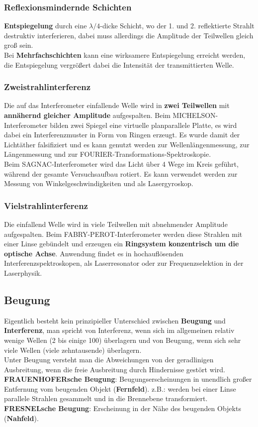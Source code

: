 \documentclass[12pt,a4paper,ngerman]{article}
\begin{document}
\subsubsection*{Reflexionsmindernde Schichten}
\textbf{Entspiegelung} durch eine $\lambda/4$-dicke Schicht, wo der 1. und 2. reflektierte Strahlt destruktiv interferieren, dabei muss allerdings die Amplitude der Teilwellen gleich groß sein. \\
Bei \textbf{Mehrfachschichten} kann eine wirksamere Entspiegelung erreicht werden, die Entspiegelung vergrößert dabei die Intensität der transmittierten Welle.

\subsubsection*{Zweistrahlinterferenz}
Die auf das Interferometer einfallende Welle wird in \textbf{zwei Teilwellen} mit \textbf{annähernd gleicher Amplitude} aufgespalten. Beim MICHELSON-Interferometer bilden zwei Spiegel eine virtuelle planparallele Platte, es wird dabei ein Interferenzmuster in Form von Ringen erzeugt. Es wurde damit der Lichtäther falsifiziert und es kann genutzt werden zur Wellenlängenmessung, zur Längenmessung und zur FOURIER-Transformations-Spektroskopie.  \\
Beim SAGNAC-Interferometer wird das Licht über 4 Wege im Kreis geführt, während der gesamte Versuchsaufbau rotiert. Es kann verwendet werden zur Messung von Winkelgeschwindigkeiten und als Lasergyroskop. 

\subsubsection*{Vielstrahlinterferenz}
Die einfallend Welle wird in viele Teilwellen mit abnehmender Amplitude aufgespalten. Beim FABRY-PEROT-Interferometer werden diese Strahlen mit einer Linse gebündelt und erzeugen ein \textbf{Ringsystem konzentrisch um die optische Achse}. Anwendung findet es in hochauflösenden Interferenzspektroskopen, als Laserresonator oder zur Frequenzselektion in der Laserphysik. 


\subsection{Beugung}

Eigentlich besteht kein prinzipieller Unterschied zwischen \textbf{Beugung} und \textbf{Interferenz}, man spricht von Interferenz, wenn sich im allgemeinen relativ wenige Wellen (2 bis einige 100) überlagern und von Beugung, wenn sich sehr viele Wellen (viele zehntausende) überlagern. \\
Unter Beugung versteht man die Abweichungen von der geradlinigen Ausbreitung, wenn die freie Ausbreitung durch Hindernisse gestört wird. \\
\textbf{FRAUENHOFERsche Beugung}: Beugungserscheinungen in unendlich großer Entfernung vom beugenden Objekt (\textbf{Fernfeld}). z.B.: werden bei einer Linse parallele Strahlen gesammelt und in die Brennebene transformiert. \\
\textbf{FRESNELsche Beugung}: Erscheinung in der Nähe des beugenden Objekts (\textbf{Nahfeld}).
\end{document}
